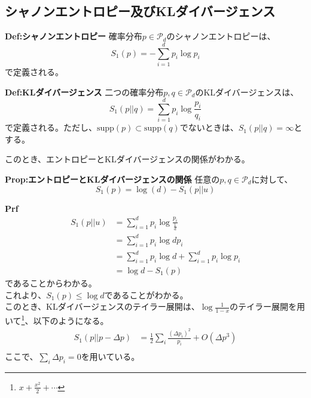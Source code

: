 \documentclass[a4paper,11pt]{jsarticle}
\numberwithin{equation}{section}
\begin{document}
\subsection{シャノンエントロピー及びKLダイバージェンス}
\begin{itembox}[l]{\textbf{Def:シャノンエントロピー}}
    確率分布$p \in \mathcal{P}_d$のシャノンエントロピーは、
    \begin{equation}
        S_1(p) = -\sum_{i=1}^{d}p_i\log p_i
    \end{equation}
    で定義される。
\end{itembox}
\begin{itembox}[l]{\textbf{Def:KLダイバージェンス}}
    二つの確率分布$p, q \in \mathcal{P}_d$のKLダイバージェンスは、
    \begin{equation}
        S_1(p||q) = \sum_{i=1}^{d}p_i\log\frac{p_i}{q_i}
    \end{equation}
    で定義される。ただし、$\text{supp}(p) \subset \text{supp}(q)$でないときは、$S_1(p||q) = \infty$とする。
\end{itembox}
このとき、エントロピーとKLダイバージェンスの関係がわかる。
\begin{itembox}[l]{\textbf{Prop:エントロピーとKLダイバージェンスの関係}}
    任意の$p, q \in \mathcal{P}_d$に対して、
    \begin{equation}
        S_1(p) = \log(d) - S_1(p||u)
    \end{equation}
\end{itembox}
\textbf{Prf}\\
\begin{align}
    S_1(p||u) &= \sum_{i=1}^{d}p_i\log\frac{p_i}{\frac{1}{d}}\\
    &= \sum_{i=1}^{d}p_i\log dp_i\\
    &= \sum_{i=1}^{d}p_i\log d + \sum_{i=1}^{d}p_i\log p_i\\
    &= \log d - S_1(p)
\end{align}
であることからわかる。\hfill \qedsymbol\\
これより、$S_1(p) \leq \log d$であることがわかる。\\
このとき、KLダイバージェンスのテイラー展開は、$\log \frac{1}{1-x}$のテイラー展開を用いて\footnote{$x+\frac{x^2}{2}+\cdots $}、以下のようになる。
\begin{align}
    S_1(p||p-\Delta p) &= \frac{1}{2}\sum_i \frac{(\Delta p_i)^2}{p_i} + O(\Delta p^3)\\
\end{align}
ここで、$\sum_i \Delta p_i = 0$を用いている。\\
\end{document}
